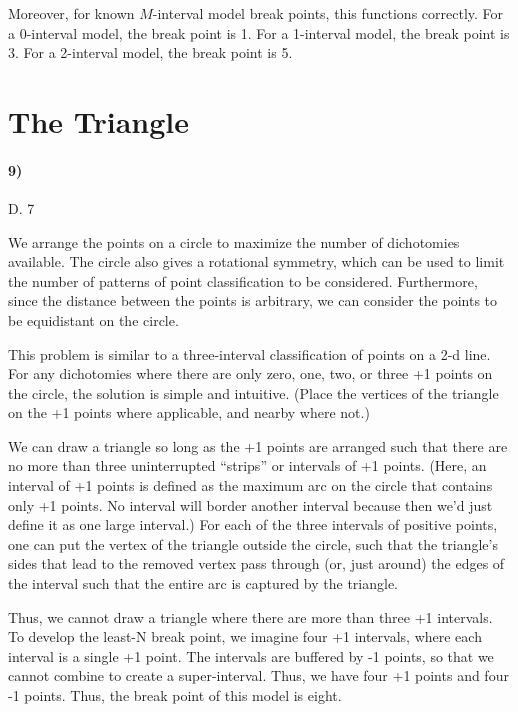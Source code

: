 \documentclass[10pt,letter]{article}
\begin{document}
	Moreover, for known $M$-interval model break points, this functions correctly. For a 0-interval model, the break point is 1. For a 1-interval model, the break point is 3. For a 2-interval model, the break point is 5. 

\section*{The Triangle}

\paragraph{9)} D. 7

	We arrange the points on a circle to maximize the number of dichotomies available. The circle also gives a rotational symmetry, which can be used to limit the number of patterns of point classification to be considered. Furthermore, since the distance between the points is arbitrary, we can consider the points to be equidistant on the circle.

	This problem is similar to a three-interval classification of points on a 2-d line. For any dichotomies where there are only zero, one, two, or three +1 points on the circle, the solution is simple and intuitive. (Place the vertices of the triangle on the +1 points where applicable, and nearby where not.) 

	We can draw a triangle so long as the +1 points are arranged such that there are no more than three uninterrupted ``strips'' or intervals of +1 points. (Here, an interval of +1 points is defined as the maximum arc on the circle that contains only +1 points. No interval will border another interval because then we'd just define it as one large interval.) For each of the three intervals of positive points, one can put the vertex of the triangle outside the circle, such that the triangle's sides that lead to the removed vertex pass through (or, just around) the edges of the interval such that the entire arc is captured by the triangle.

	Thus, we cannot draw a triangle where there are more than three +1 intervals. To develop the least-N break point, we imagine four +1 intervals, where each interval is a single +1 point. The intervals are buffered by -1 points, so that we cannot combine to create a super-interval. Thus, we have four +1 points and four -1 points. Thus, the break point of this model is eight.
\end{document}
